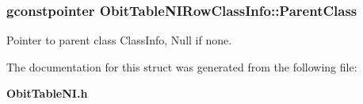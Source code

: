 \subsubsection{\setlength{\rightskip}{0pt plus 5cm}gconstpointer {\bf Obit\-Table\-NIRow\-Class\-Info::Parent\-Class}}\label{structObitTableNIRowClassInfo_o3}


Pointer to parent class Class\-Info, Null if none. 



The documentation for this struct was generated from the following file:\begin{CompactItemize}
\item 
{\bf Obit\-Table\-NI.h}\end{CompactItemize}

